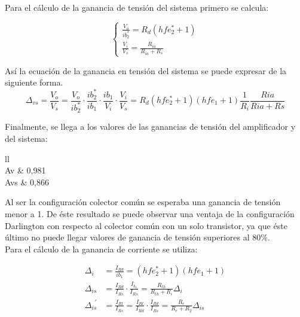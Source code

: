 Para el cálculo de la ganancia de tensión del sistema primero se calcula:

	\begin{equation}
		\begin{cases}	
		\frac{V_{o}}{ib_{2}^{*}}=R_{d}(hfe_{2}^{*}+1) \\
		\frac{V_{i}}{V_{s}}=\frac{R_{ia}}{R_{ia}+R_{s}}
		\end{cases}
		\label{mod_inc_ecs}
	\end{equation}

Así la ecuación de la ganancia en tensión del sistema se puede expresar de la siguiente forma. \\

	\begin{equation}	
		\Delta _{vs}=\frac{V_{o}}{V_{s}}=\frac{V_{o}}{ib_{2}^{*}}\cdot\frac{ib_{2}^{*}}{ib_{1}}\cdot\frac{ib_{1}}{V_{i}}\cdot\frac{V_{i}}{V_{s}}=R_{d}(hfe_{2}^{*}+1)(hfe_{1}+1)\frac{1}{R_{i}}\frac{Ria}{Ria+Rs}
		\label{mod_inc_avs}
	\end{equation}

Finalmente, se llega a los valores de las ganancias de tensión del amplificador y del sistema:

\begin{table}[H]
\centering
\begin{tabular}{ll}
 \\ \hline
Av                                       & 0,981                                     \\
Avs                                      & 0,866                                    
\end{tabular}
\end{table}

Al ser la configuración colector común se esperaba una ganancia de tensión menor a 1. De éste resultado se puede observar una ventaja de la configuración Darlington con respecto al colector común con un solo transistor, ya que éste último no puede llegar valores de ganancia de tensión superiores al 80\%.\\
Para el cálculo de la ganancia de corriente se utiliza:

	\begin{align*}
		\Delta _{i} &= \frac{I_{Rd}}{ib_{1}}=(hfe_{2}^{*}+1)(hfe_{1}+1) \\
%
	\Delta_{is} &= \frac{I_{Rd}}{I_{Rs}}\cdot\frac{I_{b_{1}}}{I_{Rs}}=\frac{R_{th}}{R_{th}+R_{i}}\Delta_{i} \\
%
		\Delta_{is}^{\, \, \,'} &= \frac{I_{Rl}}{I_{Rs}}=\frac{I_{Rl}}{I_{Rd}}\cdot\frac{I_{Rd}}{I_{Rs}}=\frac{R_{e}}{R_{e}	+R_{2}}\Delta_{is}
%
		\label{mod_inc_ais}
	\end{align*}


